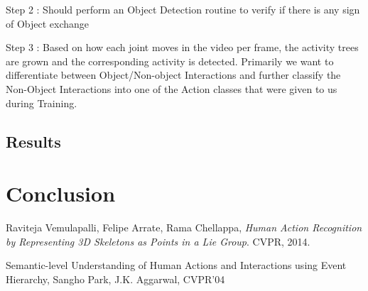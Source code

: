 \documentclass[10pt,twocolumn,letterpaper]{article}
\begin{document}
Step 2 : Should perform an Object Detection routine to verify if there is any sign of Object exchange

Step 3 : Based on how each joint moves in the video per frame, the activity trees are grown and the corresponding activity is detected. Primarily we want to differentiate between Object/Non-object Interactions and further classify the Non-Object Interactions into one of the Action classes that were given to us during Training. 


\subsection{Results}




\section{Conclusion}


\begin{thebibliography}{9}

  Raviteja  Vemulapalli,
  Felipe Arrate,
  Rama Chellappa,
  \emph{Human Action Recognition by Representing 3D Skeletons as Points in a Lie Group}.
  CVPR,
  2014.

 Semantic-level Understanding of Human Actions and Interactions using Event Hierarchy, Sangho Park, J.K. Aggarwal, CVPR'04

\end{thebibliography}
\end{document}
